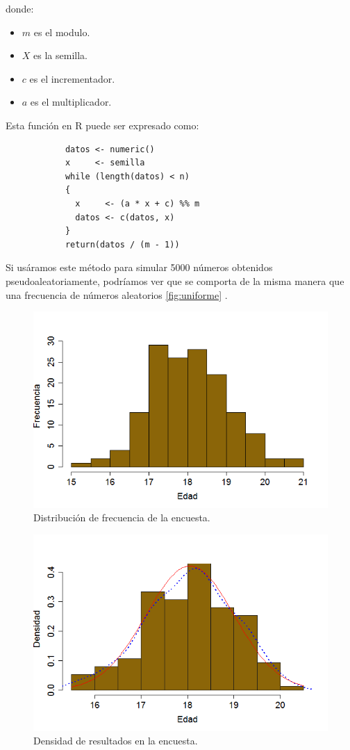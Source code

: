 \documentclass[]{article}
\begin{document}
donde:
\begin{itemize}
	\item $m$ es el modulo.
	\item $X$ es la semilla.
	\item $c$ es el incrementador.
	\item $a$ es el multiplicador.
\end{itemize}

Esta función en R puede ser expresado como:
  \begin{lstlisting}
            datos <- numeric()
            x     <- semilla
            while (length(datos) < n) 
            {
              x     <- (a * x + c) %% m
              datos <- c(datos, x)
            }
            return(datos / (m - 1))
   \end{lstlisting}

Si  usáramos este método para simular 5000 números obtenidos pseudoaleatoriamente, podríamos ver que se comporta de la misma manera que una frecuencia de números aleatorios \autoref{fig:uniforme} .





\begin{figure}[b]
    \centering
    \includegraphics[width=.5\linewidth]{Frecuencia.png}    \caption{Distribución de frecuencia de la encuesta.}
    \label{fig:Negativo}
\end{figure}

\begin{figure}[b]
    \centering
    \includegraphics[width=.5\linewidth]{Densidad.png}    \caption{Densidad de resultados en la encuesta.}
    \label{fig:Densidad}
\end{figure}
\end{document}
